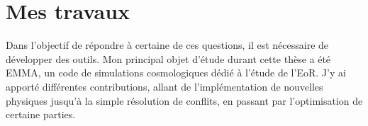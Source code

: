 %
%


\section*{Mes travaux}

Dans l'objectif de répondre à certaine de ces questions, il est nécessaire de développer des outils.
Mon principal objet d'étude durant cette thèse a été EMMA, un code de simulations cosmologiques dédié à l'étude de l'\ac{EoR}.
J'y ai apporté différentes contributions, allant de l'implémentation de nouvelles physiques jusqu'à la simple résolution de conflits, en passant par l'optimisation de certaine parties.

